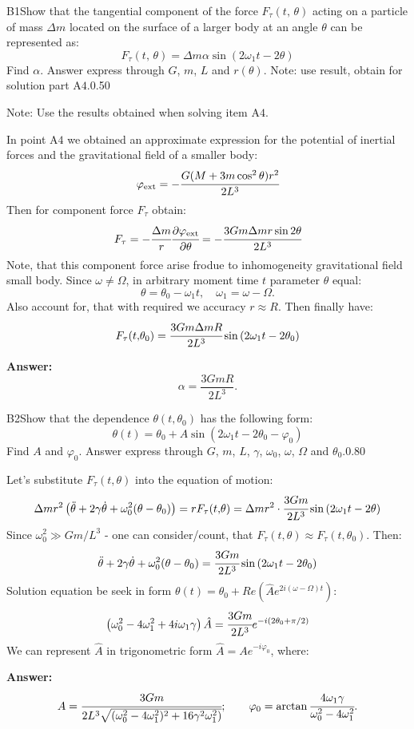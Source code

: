 \documentclass[11pt,a4paper]{article}
\begin{document}
\begin{solcard}{B1}{Show that the tangential component of the force $F_\tau(t,\, \theta)$ acting on a particle of mass $\Delta{m}$ located on the surface of a larger body at an angle $\theta$ can be represented as: $$F_\tau(t,\,\theta)=\Delta{m}\alpha\sin(2\omega_1t-2\theta) $$ Find $\alpha$. Answer express through $G$, $m$, $L$ and $r(\theta)$. Note: use result, obtain for solution part $\mathrm{A4}$.}{0.50}

Note: Use the results obtained when solving item $\mathrm{A4}$.


In point $\mathrm{A4}$ we obtained an approximate expression for the potential of inertial forces and the gravitational field of a smaller body: $$\varphi_\text{ext}=-\cfrac{G(M+3m\cos^2\theta)r^2}{2L^3} $$ Then for component force $F_\tau$ obtain: $$F_\tau=-\cfrac{\Delta{m}}{r}\cfrac{\partial{\varphi_\text{ext}}}{\partial{\theta}}=-\cfrac{3Gm\Delta{m}r\sin2\theta}{2L^3} $$ Note, that this component force arise frodue to inhomogeneity gravitational field small body. Since $\omega\neq{\Omega}$, in arbitrary moment time $t$ parameter $\theta$ equal: $$\theta=\theta_0-\omega_1 t, \quad \omega_1 = \omega - \Omega. $$ Also account for, that with required we accuracy $r \approx R$. Then finally have: $$F_\tau(t{,}\theta_0)=\cfrac{3Gm\Delta{m}R}{2L^3}\sin\left(2\omega_1 t-2\theta_0\right) $$

\par\smallskip\noindent\textbf{Answer:} $$ \alpha = \frac{3 GmR}{2 L^3}. $$
\end{solcard}

\begin{solcard}{B2}{Show that the dependence $\theta(t{,}\theta_0)$ has the following form: $$\theta(t)=\theta_0+A\sin(2\omega_1t-2\theta_0-\varphi_0) $$ Find $A$ and $\varphi_0$.  Answer express through $G$, $m$, $L$, $\gamma$,  $\omega_0$, $\omega$, $\Omega$ and $\theta_0$.}{0.80}

Let's substitute $F_\tau(t{,}\theta)$ into the equation of motion: $$\Delta{m}r^2\left(\ddot{\theta}+2\gamma\dot{\theta}+\omega^2_0(\theta-\theta_0)\right)=rF_\tau(t{,}\theta)=\Delta{m}r^2\cdot\cfrac{3Gm}{2L^3}\sin\left(2\omega_1 t-2\theta\right) $$ Since $\omega^2_0\gg{Gm/L^3}$ - one can consider/count, that $F_\tau(t{,}\theta)\approx{F_\tau(t{,}\theta_0)}$. Then: $$\ddot{\theta}+2\gamma\dot{\theta}+\omega^2_0(\theta-\theta_0)=\cfrac{3Gm}{2L^3}\sin\left(2\omega_1 t-2\theta_0\right) $$ Solution equation be seek in form $\theta(t) =\theta_0 + Re\left(\hat{A}e^{2i(\omega-\Omega)t}\right)$: $$\left(\omega^2_0-4\omega_1^2+4i\omega_1\gamma\right)\hat{A}=\cfrac{3Gm}{2L^3}e^{-i(2\theta_0+\pi/2)} $$ We can represent $\hat{A}$ in trigonometric form $\hat{A}=Ae^{-i\varphi_0}$, where:

\par\smallskip\noindent\textbf{Answer:} $$A=\cfrac{3Gm}{2L^3\sqrt{(\omega^2_0-4\omega_1^2)^2+16\gamma^2\omega_1^2)}};\qquad \varphi_0=\arctan\cfrac{4\omega_1\gamma}{\omega^2_0-4\omega_1^2}. $$
\end{solcard}
\end{document}
